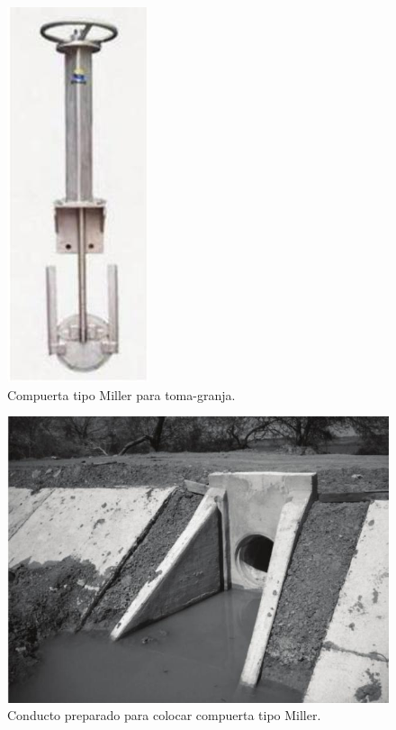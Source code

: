 \begin{figure}[h]
\centering
\includegraphics[scale=.65]{./Figures/CompuertaMiller.jpeg}
\caption{Compuerta tipo Miller para toma-granja.}
\label{fig:Compuerta tipo miller para toma-granja}
\end{figure}

\begin{figure}[h]
\centering
\includegraphics[scale=.58]{./Figures/ConductoPreparadoParaCompuertaMiller.jpeg}
\caption{Conducto preparado para colocar compuerta tipo Miller.}
\label{fig:Conducto preparado para colocar compuerta tipo miller.}
\end{figure}


